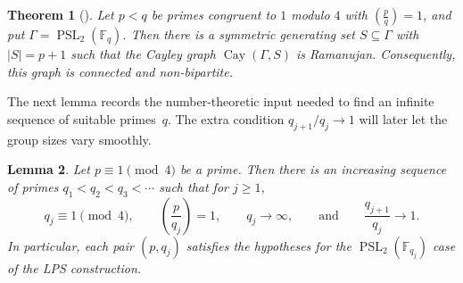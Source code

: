 \documentclass[10pt]{article}
\numberwithin{equation}{section}
\newtheorem{theorem}{Theorem}[section]
\newtheorem{lemma}[theorem]{Lemma}
\DeclareMathOperator{\PSL}{PSL}
\DeclareMathOperator{\Cay}{Cay}
\begin{document}
\begin{theorem}[\cite{LPS1988}]\label{thm:LPSOneQ} Let $p<q$ be primes congruent to $1$ modulo $4$ with $\left(\frac{p}{q}\right)=1$, and put $\Gamma=\PSL_2(\mathbb F_q)$. Then there is a symmetric generating set $S\subseteq \Gamma$ with $|S|=p+1$ such that the Cayley graph $\Cay(\Gamma,S)$ is Ramanujan. Consequently, this graph is connected and non-bipartite.
\end{theorem}

The next lemma records the number-theoretic input needed to find an infinite sequence of suitable primes~$q$. The extra condition $q_{j+1}/q_j\to1$ will later let the group sizes vary smoothly.

\begin{lemma}\label{lem:choice-qj}
Let $p\equiv 1 \pmod 4$ be a prime. Then there is an increasing sequence of primes $q_1<q_2<q_3<\cdots$ such that for $j \ge 1$,
\[
        q_j\equiv 1 \pmod 4,\qquad \left(\frac{p}{q_j}\right)=1,\qquad q_j\to\infty,\qquad\text{and}\qquad \frac{q_{j+1}}{q_j}\to 1.
\]
In particular, each pair $(p,q_j)$ satisfies the hypotheses for the $\PSL_2(\mathbb F_{q_j})$ case of the LPS construction.
\end{lemma}
\end{document}
